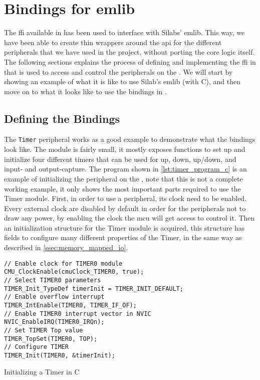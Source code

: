 
\section{Bindings for emlib}
\label{sub:interfacing_with_emlib}

The \gls{ffi} available in {\rust} has been used to interface with Silabs' emlib.
This way, we have been able to create thin wrappers around the \gls{api} for the different peripherals that we have used in the project, without porting the core logic itself.
The following sections explains the process of defining and implementing the \gls{ffi} in {\rust} that is used to access and control the peripherals on the {\gecko}.
We will start by showing an example of what it is like to use Silab's emlib (with C), and then move on to what it looks like to use the bindings in {\rust}.

\subsection{Defining the Bindings}

The \texttt{Timer} peripheral \cite{an0014_timer} works as a good example to demonstrate what the {\rust} bindings look like.
The module is fairly small, it mostly exposes functions to set up and initialize four different timers that can be used for up, down, up/down, and input- and output-capture.
The program shown in \autoref{lst:timer_program_c} is an example of initializing the  peripheral on the {\gecko}, note that this is not a complete working example, it only shows the most important parts required to use the Timer module.
First, in order to use a peripheral, its clock need to be enabled.
Every external clock are disabled by default  in order for the peripherals not to draw any power, by enabling the clock the \gls{mcu} will get access to control it.
Then an initialization structure for the Timer module is acquired, this structure has fields to configure many different properties of the Timer, in the same way as described in \autoref{ssec:memory_mapped_io}.

\begin{listing}[h]
\begin{verbatim}
// Enable clock for TIMER0 module
CMU_ClockEnable(cmuClock_TIMER0, true);
// Select TIMER0 parameters
TIMER_Init_TypeDef timerInit = TIMER_INIT_DEFAULT;
// Enable overflow interrupt
TIMER_IntEnable(TIMER0, TIMER_IF_OF);
// Enable TIMER0 interrupt vector in NVIC
NVIC_EnableIRQ(TIMER0_IRQn);
// Set TIMER Top value
TIMER_TopSet(TIMER0, TOP);
// Configure TIMER
TIMER_Init(TIMER0, &timerInit);
\end{verbatim}
\caption{Initializing a Timer in C}
\label{lst:timer_program_c}
\end{listing}

